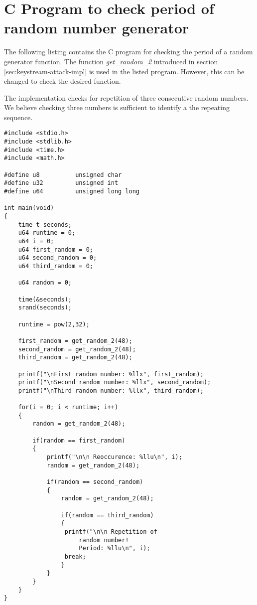 \chapter{C Program to check period of random number generator}
\label{app:random-function}

The following listing contains the C program for checking the period of a random generator function. The function \textit{get\_random\_2} introduced in section \ref{sec:keystream-attack-impl} is used in the listed program. However, this can be changed to check the desired function. 

The implementation checks for repetition of three consecutive random numbers. We believe checking three numbers is sufficient to identify a the repeating sequence.\\

\begin{lstlisting}[frame=tb]
#include <stdio.h>
#include <stdlib.h>
#include <time.h>
#include <math.h>

#define u8			unsigned char
#define u32			unsigned int
#define u64			unsigned long long

int main(void)
{
	time_t seconds;
	u64 runtime = 0;
	u64 i = 0;
	u64 first_random = 0;
	u64 second_random = 0;
	u64 third_random = 0;

	u64 random = 0;

	time(&seconds);
	srand(seconds);

	runtime = pow(2,32);
	
	first_random = get_random_2(48);
	second_random = get_random_2(48);
	third_random = get_random_2(48);
	
	printf("\nFirst random number: %llx", first_random);
	printf("\nSecond random number: %llx", second_random);
	printf("\nThird random number: %llx", third_random);
	
	for(i = 0; i < runtime; i++)
	{
		random = get_random_2(48);	
		
		if(random == first_random)
		{
			printf("\n\n Reoccurence: %llu\n", i);
			random = get_random_2(48);

			if(random == second_random)
			{
				random = get_random_2(48);
				
				if(random == third_random)
				{
				 printf("\n\n Repetition of 
				     random number! 
				     Period: %llu\n", i);
				 break;
				}
			}
		}
	}
}			
\end{lstlisting}

